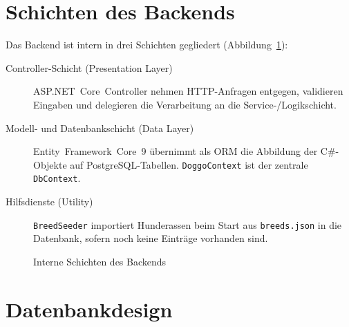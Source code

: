 \section{Schichten des Backends}
\label{sec:schichten-backend}

Das Backend ist intern in drei Schichten gegliedert (Abbildung~\ref{fig:backend-schichten}):

\begin{description}
  \item[Controller-Schicht (Presentation Layer)]
    ASP.NET~Core~Controller nehmen HTTP-Anfragen entgegen, validieren Eingaben und
    delegieren die Verarbeitung an die Service-/Logikschicht.
  \item[Modell- und Datenbankschicht (Data Layer)]
    Entity~Framework~Core~9 übernimmt als ORM die Abbildung der C\#-Objekte auf
    PostgreSQL-Tabellen. \texttt{DoggoContext} ist der zentrale \texttt{DbContext}.
  \item[Hilfsdienste (Utility)]
    \texttt{BreedSeeder} importiert Hunderassen beim Start aus \texttt{breeds.json} in die
    Datenbank, sofern noch keine Einträge vorhanden sind.
\end{description}

\begin{figure}[H]
  \centering
  \caption{Interne Schichten des Backends}
  \label{fig:backend-schichten}
\end{figure}

\section{Datenbankdesign}
\label{sec:datenbankdesign}

